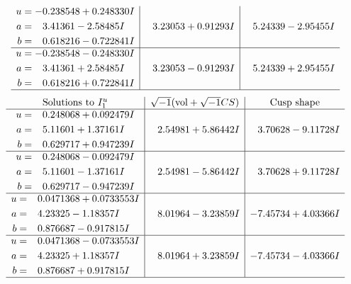 \documentclass[1p]{elsarticle_modified}
\theoremstyle{definition}
\newcommand{\I}{\sqrt{-1}}
\begin{document}
$$\begin{array}{c|c|c}
\begin{aligned}
u &= -0.238548 + 0.248330 I \\
a &= \phantom{-}3.41361 - 2.58485 I \\
b &= \phantom{-}0.618216 - 0.722841 I\end{aligned}
 & \phantom{-}3.23053 + 0.91293 I & \phantom{-}5.24339 - 2.95455 I \\ \hline\begin{aligned}
u &= -0.238548 - 0.248330 I \\
a &= \phantom{-}3.41361 + 2.58485 I \\
b &= \phantom{-}0.618216 + 0.722841 I\end{aligned}
 & \phantom{-}3.23053 - 0.91293 I & \phantom{-}5.24339 + 2.95455 I\\
 \hline 
 \end{array}$$\newpage$$\begin{array}{c|c|c}  
\text{Solutions to }I^u_{1}& \I (\text{vol} + \sqrt{-1}CS) & \text{Cusp shape}\\
 \hline 
\begin{aligned}
u &= \phantom{-}0.248068 + 0.092479 I \\
a &= \phantom{-}5.11601 + 1.37161 I \\
b &= \phantom{-}0.629717 + 0.947239 I\end{aligned}
 & \phantom{-}2.54981 + 5.86442 I & \phantom{-}3.70628 - 9.11728 I \\ \hline\begin{aligned}
u &= \phantom{-}0.248068 - 0.092479 I \\
a &= \phantom{-}5.11601 - 1.37161 I \\
b &= \phantom{-}0.629717 - 0.947239 I\end{aligned}
 & \phantom{-}2.54981 - 5.86442 I & \phantom{-}3.70628 + 9.11728 I \\ \hline\begin{aligned}
u &= \phantom{-}0.0471368 + 0.0733553 I \\
a &= \phantom{-}4.23325 - 1.18357 I \\
b &= \phantom{-}0.876687 - 0.917815 I\end{aligned}
 & \phantom{-}8.01964 - 3.23859 I & -7.45734 + 4.03366 I \\ \hline\begin{aligned}
u &= \phantom{-}0.0471368 - 0.0733553 I \\
a &= \phantom{-}4.23325 + 1.18357 I \\
b &= \phantom{-}0.876687 + 0.917815 I\end{aligned}
 & \phantom{-}8.01964 + 3.23859 I & -7.45734 - 4.03366 I\\
 \hline 
 \end{array}$$\newpage\newpage\renewcommand{\arraystretch}{1}
\end{document}
